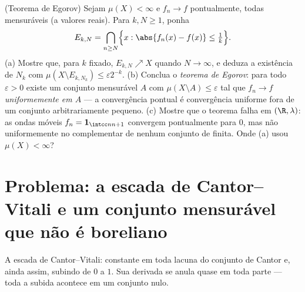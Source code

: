 \begin{exercise}[$\star\star\star$]\label{exo:b3:measure:12}
(Teorema de Egorov) Sejam $\mu(X) < \infty$ e $f_n \to f$ pontualmente, todas mensuráveis
(a valores reais). Para $k, N \geq 1$, ponha
\[
E_{k,N} = \bigcap_{n \geq N}\Bigl\{x : \abs{f_n(x) - f(x)}
\leq \tfrac1k\Bigr\} .
\]
(a) Mostre que, para $k$ fixado, $E_{k,N} \nearrow X$ quando $N \to
\infty$, e deduza a
existência de $N_k$ com $\mu(X \setminus E_{k,N_k})
\leq \varepsilon2^{-k}$.
(b) Conclua o \emph{teorema de Egorov}: para todo $\varepsilon
> 0$ existe um
conjunto mensurável $A$ com $\mu(X\setminus A) \leq
\varepsilon$ tal que $f_n \to f$ \emph{uniformemente
em $A$} --- a convergência pontual é convergência uniforme fora de
um conjunto arbitrariamente pequeno.
(c) Mostre que o teorema falha em $(\R, \lambda)$: as ondas móveis $f_n = \mathbf 1_{\intcc n{n+1}}$ convergem
pontualmente para $0$, mas não uniformemente no complementar de
nenhum conjunto de  finita. Onde (a) usou $\mu(X) < \infty$?
\end{exercise}

\section{Problema: a escada de Cantor--Vitali e um conjunto mensurável
que não é boreliano}

\begin{omfigure}

{\small A escada de Cantor--Vitali: constante em toda lacuna do
conjunto de Cantor e, ainda assim, subindo  de $0$ a
$1$. Sua derivada se anula quase em toda parte --- toda a subida
acontece em um conjunto nulo.}
\end{omfigure}

